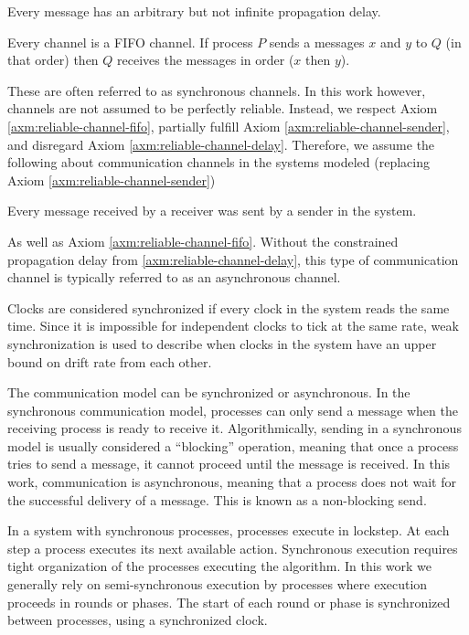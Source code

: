 \begin{axm}
    \label{axm:reliable-channel-delay}
    Every message has an arbitrary but not infinite propagation delay.\cite{DISTRIBUTED}
\end{axm}

\begin{axm}
    \label{axm:reliable-channel-fifo}
    Every channel is a \ac{FIFO} channel. If process $P$ sends a messages $x$ and $y$ to $Q$ (in that order) then $Q$ receives the messages in order ($x$ then $y$).\cite{DISTRIBUTED}
\end{axm}

These are often referred to as synchronous channels.
In this work however, channels are not assumed to be perfectly reliable.
Instead, we respect Axiom \ref{axm:reliable-channel-fifo}, partially fulfill Axiom \ref{axm:reliable-channel-sender}, and disregard Axiom \ref{axm:reliable-channel-delay}.
Therefore, we assume the following about communication channels in the systems modeled (replacing Axiom \ref{axm:reliable-channel-sender})

\begin{axm}
    Every message received by a receiver was sent by a sender in the system.
\end{axm}

As well as Axiom \ref{axm:reliable-channel-fifo}.
Without the constrained propagation delay from \ref{axm:reliable-channel-delay}, this type of communication channel is typically referred to as an asynchronous channel.

Clocks are considered synchronized if every clock in the system reads the same time.
Since it is impossible for independent clocks to tick at the same rate, weak synchronization is used to describe when clocks in the system have an upper bound on drift rate from each other.

The communication model can be synchronized or asynchronous.
In the synchronous communication model, processes can only send a message when the receiving process is ready to receive it.
Algorithmically, sending in a synchronous model is usually considered a ``blocking'' operation, meaning that once a process tries to send a message, it cannot proceed until the message is received.
In this work, communication is asynchronous, meaning that a process does not wait for the successful delivery of a message.
This is known as a non-blocking send.

In a system with synchronous processes, processes execute in lockstep.
At each step a process executes its next available action.
Synchronous execution requires tight organization of the processes executing the algorithm.
In this work we generally rely on semi-synchronous execution by processes where execution proceeds in rounds or phases.
The start of each round or phase is synchronized between processes, using a synchronized clock.

